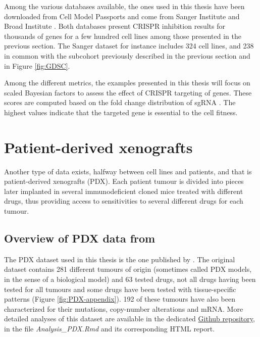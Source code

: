 \documentclass[a4paper,12pt,twoside,onecolumn,openright,final,oldfontcommands]{memoir}
\begin{document}
Among the various databases available, the ones used in this thesis have
been downloaded from Cell Model Passports and come from Sanger Institute
\citep{behan2019prioritization} and Broad Institute
\citep{meyers2017computational}. Both databases present CRISPR
inhibition results for thousands of genes for a few hundred cell lines
among those presented in the previous section. The Sanger dataset for
instance includes 324 cell lines, and 238 in common with the subcohort
previously described in the previous section and in Figure
\ref{fig:GDSC}.

Among the different metrics, the examples presented in this thesis will
focus on scaled Bayesian factors to assess the effect of CRISPR
targeting of genes. These scores are computed based on the fold change
distribution of sgRNA \citep{hart2016bagel}. The highest values indicate
that the targeted gene is essential to the cell fitness.

\section{Patient-derived xenografts}\label{appendix-PDX}

Another type of data exists, halfway between cell lines and patients,
and that is patient-derived xenografts (PDX). Each patient tumour is
divided into pieces later implanted in several immunodeficient cloned
mice treated with different drugs, thus providing access to
sensitivities to several different drugs for each tumour.

\subsection{\texorpdfstring{Overview of PDX data from
\citet{gao2015high}}{Overview of PDX data from @gao2015high}}\label{overview-of-pdx-data-from-gao2015high}

The PDX dataset used in this thesis is the one published by
\citet{gao2015high}. The original dataset contains 281 different tumours
of origin (sometimes called PDX models, in the sense of a biological
model) and 63 tested drugs, not all drugs having been tested for all
tumours and some drugs have been tested with tissue-specific patterns
(Figure \ref{fig:PDX-appendix}). 192 of these tumours have also been
characterized for their mutations, copy-number alterations and mRNA.
More detailed analyses of this dataset are available in the dedicated
\href{https://github.com/JonasBeal/Causal_Precision_Medicine}{Github
repository}, in the file \emph{Analysis\_PDX.Rmd} and its corresponding
HTML report.
\end{document}
